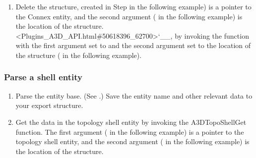 \documentclass[letterpaper,12pt,english,openany,oneside]{sphinxmanual}
\begin{document}
\begin{sphinxVerbatim}[commandchars=\\\{\}]
       
  \PYG{p}{[}\PYG{p}{]}
\end{sphinxVerbatim}
\begin{enumerate}
%
\setcounter{enumi}{3}
\item {} 
Delete the  structure, created in Step  in the following example) is a pointer to the Connex entity, and the second argument ( in the following example) is the location of the  structure. <Plugins\_A3D\_API.html\#50618396\_62700>`\_\_, by invoking the  function with the first argument set to  and the second argument set to the location of the structure ( in the following example).

\end{enumerate}

\begin{sphinxVerbatim}[commandchars=\\\{\}]
 
\end{sphinxVerbatim}


\subsubsection{Parse a shell entity}
\label{\detokenize{Plugins_A3D_API:parse-a-shell-entity}}\begin{enumerate}
%
\item {} 
Parse the entity base. (See .) Save the entity name and other relevant data to your export structure.

\item {} 
Get the data in the topology shell entity by invoking the A3DTopoShellGet function. The first argument ( in the following example) is a pointer to the topology shell entity, and the second argument ( in the following example) is the location of the  structure.

\end{enumerate}
\end{document}
